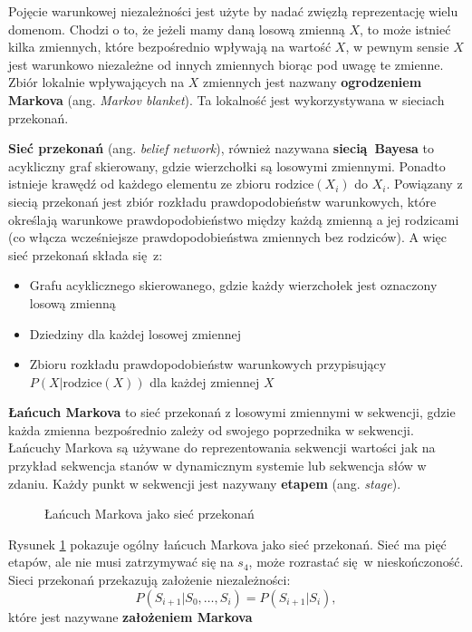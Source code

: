 \documentclass[a4paper, 12pt,oneside]{book}
\begin{document}
Pojęcie warunkowej niezależności jest użyte by nadać zwięzłą reprezentację
wielu domenom. Chodzi o to, że jeżeli mamy daną losową zmienną $X$, to może
istnieć kilka zmiennych, które bezpośrednio wpływają na wartość $X$, w pewnym
sensie $X$ jest warunkowo niezależne od innych zmiennych biorąc pod uwagę te
zmienne. Zbiór lokalnie wpływających na $X$ zmiennych jest nazwany
\textbf{ogrodzeniem Markova} (ang. \textit{Markov blanket}). Ta lokalność
jest wykorzystywana w sieciach przekonań\cite{ai_foundations_belief_networks}.

\textbf{Sieć przekonań} (ang. \textit{belief network}), również nazywana
\textbf{siecią Bayesa} to acykliczny graf skierowany, gdzie wierzchołki są
losowymi zmiennymi. Ponadto istnieje krawędź od każdego elementu ze zbioru
$\text{rodzice}(X_i)$ do $X_i$. Powiązany z siecią przekonań jest zbiór
rozkładu prawdopodobieństw warunkowych, które określają warunkowe
prawdopodobieństwo między każdą zmienną a jej rodzicami (co włącza wcześniejsze
prawdopodobieństwa zmiennych bez rodziców). A więc sieć przekonań składa się z:
\begin{itemize}
	\setlength\itemsep{-0.4em}
\item Grafu acyklicznego skierowanego, gdzie każdy wierzchołek jest oznaczony
	losową zmienną
\item Dziedziny dla każdej losowej zmiennej
\item Zbioru rozkładu prawdopodobieństw warunkowych przypisujący
	$P(X|\text{rodzice}(X))$ dla każdej zmiennej $X$
\end{itemize}

\textbf{Łańcuch Markova} to sieć przekonań z losowymi zmiennymi w sekwencji,
gdzie każda zmienna bezpośrednio zależy od swojego poprzednika w sekwencji.
Łańcuchy Markova są używane do reprezentowania sekwencji wartości jak
na przykład sekwencja stanów w dynamicznym systemie lub sekwencja słów w
zdaniu. Każdy punkt w sekwencji jest nazywany \textbf{etapem} (ang.
\textit{stage}).
\begin{figure}[!htb]
\begin{center}
\caption{Łańcuch Markova jako sieć przekonań}
\label{markov_chain}
\end{center}
\end{figure}
Rysunek \ref{markov_chain} pokazuje ogólny łańcuch Markova jako sieć przekonań.
Sieć ma pięć etapów, ale nie musi zatrzymywać się na $s_4$, może rozrastać
się w nieskończoność. Sieci przekonań przekazują założenie niezależności:
\[P(S_{i+1} | S_0, \dots , S_i) = P(S_{i+1} | S_i),\]
które jest nazywane \textbf{założeniem Markova}
\end{document}
